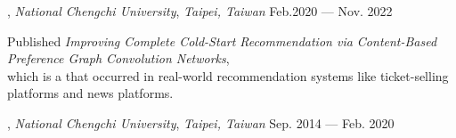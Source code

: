 , \textit{National Chengchi University}, \textit{\small{Taipei, Taiwan}}	\hfill Feb.2020 --- Nov. 2022

\begin{zitemize}
  \item Published \textit{Improving Complete Cold-Start
  Recommendation via Content-Based Preference
  Graph Convolution Networks},\\ which is a  that occurred in real-world recommendation systems like ticket-selling platforms and news platforms.
\end{zitemize}

, \textit{National Chengchi University}, \textit{\small{Taipei, Taiwan}}	\hfill Sep. 2014 --- Feb. 2020